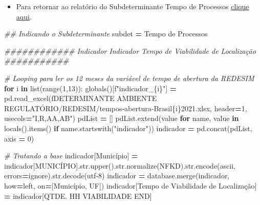 \documentclass[
  12,
  dvipsnames]{article}
\newenvironment{Shaded}{\begin{snugshade}}{\end{snugshade}}
\newcommand{\BuiltInTok}[1]{#1}
\newcommand{\CommentTok}[1]{\textcolor[rgb]{0.56,0.35,0.01}{\textit{#1}}}
\newcommand{\ControlFlowTok}[1]{\textcolor[rgb]{0.13,0.29,0.53}{\textbf{#1}}}
\newcommand{\DecValTok}[1]{\textcolor[rgb]{0.00,0.00,0.81}{#1}}
\newcommand{\KeywordTok}[1]{\textcolor[rgb]{0.13,0.29,0.53}{\textbf{#1}}}
\newcommand{\NormalTok}[1]{#1}
\newcommand{\OperatorTok}[1]{\textcolor[rgb]{0.81,0.36,0.00}{\textbf{#1}}}
\newcommand{\SpecialCharTok}[1]{\textcolor[rgb]{0.00,0.00,0.00}{#1}}
\newcommand{\SpecialStringTok}[1]{\textcolor[rgb]{0.31,0.60,0.02}{#1}}
\newcommand{\StringTok}[1]{\textcolor[rgb]{0.31,0.60,0.02}{#1}}
\providecommand{\tightlist}{%
  \setlength{\itemsep}{0pt}\setlength{\parskip}{0pt}}
\begin{document}
\begin{itemize}
\tightlist
\item
  Para retornar ao relatório do Subdeterminante Tempo de Processos
  \protect\hyperlink{subdet_tempo_processo}{clique aqui}.
\end{itemize}

\begin{Shaded}
\begin{Highlighting}[]
\CommentTok{\#\# Indicando o Subdeterminante}
\NormalTok{subdet }\OperatorTok{=} \StringTok{\textquotesingle{}Tempo de Processos\textquotesingle{}}

\CommentTok{\#\#\#\#\#\#\#\#\#\#\#\# Indicador Indicador Tempo de Viabilidade de Localização \#\#\#\#\#\#\#\#\#\#\#}

\CommentTok{\# Looping para ler os 12 meses da variável de tempo de abertura da REDESIM}
\ControlFlowTok{for}\NormalTok{ i }\KeywordTok{in} \BuiltInTok{list}\NormalTok{(}\BuiltInTok{range}\NormalTok{(}\DecValTok{1}\NormalTok{,}\DecValTok{13}\NormalTok{)):}
    \BuiltInTok{globals}\NormalTok{()[}\SpecialStringTok{f"indicador\_}\SpecialCharTok{\{}\NormalTok{i}\SpecialCharTok{\}}\SpecialStringTok{"}\NormalTok{] }\OperatorTok{=}\NormalTok{ pd.read\_excel(}\SpecialStringTok{f\textquotesingle{}DETERMINANTE AMBIENTE REGULATÓRIO/REDESIM/tempos{-}abertura{-}Brasil}\SpecialCharTok{\{}\NormalTok{i}\SpecialCharTok{\}}\SpecialStringTok{2021.xlsx\textquotesingle{}}\NormalTok{, }
\NormalTok{                                                    header}\OperatorTok{=}\DecValTok{1}\NormalTok{, usecols}\OperatorTok{=}\StringTok{"I,R,AA,AB"}\NormalTok{)}
\NormalTok{    pdList }\OperatorTok{=}\NormalTok{ []}
\NormalTok{    pdList.extend(value }\ControlFlowTok{for}\NormalTok{ name, value }\KeywordTok{in} \BuiltInTok{locals}\NormalTok{().items() }\ControlFlowTok{if}\NormalTok{ name.startswith(}\StringTok{"indicador"}\NormalTok{))}
\NormalTok{    indicador }\OperatorTok{=}\NormalTok{ pd.concat(pdList, axis }\OperatorTok{=} \DecValTok{0}\NormalTok{)}

\CommentTok{\# Tratando a base}
\NormalTok{indicador[}\StringTok{\textquotesingle{}Município\textquotesingle{}}\NormalTok{] }\OperatorTok{=}\NormalTok{ indicador[}\StringTok{\textquotesingle{}MUNICÍPIO\textquotesingle{}}\NormalTok{].}\BuiltInTok{str}\NormalTok{.upper().}\BuiltInTok{str}\NormalTok{.normalize(}\StringTok{\textquotesingle{}NFKD\textquotesingle{}}\NormalTok{).}\BuiltInTok{str}\NormalTok{.encode(}\StringTok{\textquotesingle{}ascii\textquotesingle{}}\NormalTok{, errors}\OperatorTok{=}\StringTok{\textquotesingle{}ignore\textquotesingle{}}\NormalTok{).}\BuiltInTok{str}\NormalTok{.decode(}\StringTok{\textquotesingle{}utf{-}8\textquotesingle{}}\NormalTok{)}
\NormalTok{indicador }\OperatorTok{=}\NormalTok{ database.merge(indicador, how}\OperatorTok{=}\StringTok{\textquotesingle{}left\textquotesingle{}}\NormalTok{, on}\OperatorTok{=}\NormalTok{[}\StringTok{\textquotesingle{}Município\textquotesingle{}}\NormalTok{, }\StringTok{\textquotesingle{}UF\textquotesingle{}}\NormalTok{])}
\NormalTok{indicador[}\StringTok{\textquotesingle{}Tempo de Viabilidade de Localização\textquotesingle{}}\NormalTok{] }\OperatorTok{=}\NormalTok{ indicador[}\StringTok{\textquotesingle{}QTDE.  HH VIABILIDADE END\textquotesingle{}}\NormalTok{]}


\end{Highlighting}
\end{Shaded}
\end{document}
